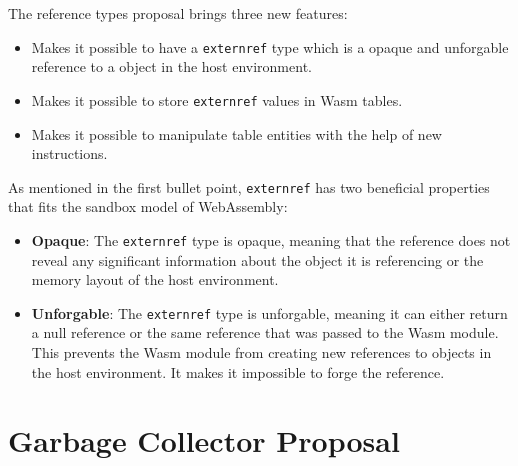 The reference types proposal brings three new features:
\begin{itemize}
    \item Makes it possible to have a \texttt{externref} type which is a opaque and unforgable reference to a object in the host environment.
    \item Makes it possible to store \texttt{externref} values in Wasm tables.
    \item Makes it possible to manipulate table entities with the help of new instructions.
\end{itemize}

As mentioned in the first bullet point, \texttt{externref} has two beneficial properties that fits the sandbox model of WebAssembly:
\begin{itemize}
    \item \textbf{Opaque}: The \texttt{externref} type is opaque, meaning that the reference does not reveal any significant information about the object it is referencing or the memory layout of the host environment.
    \item \textbf{Unforgable}: The \texttt{externref} type is unforgable, meaning it can either return a null reference or the same reference that was passed to the Wasm module. This prevents the Wasm module from creating new references to objects in the host environment. It makes it impossible to forge the reference. 
\end{itemize}



\section{Garbage Collector Proposal}
\label{sec:gc-proposals}

